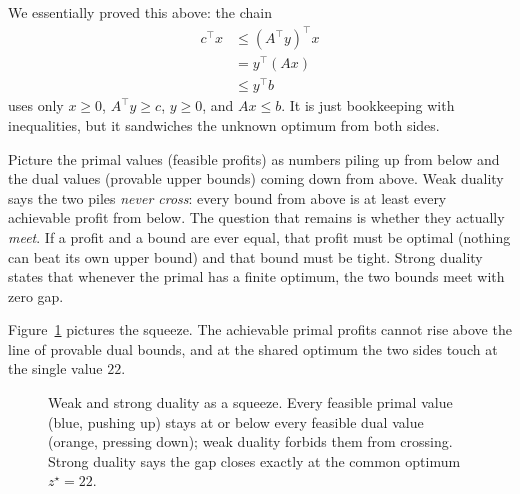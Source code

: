 We essentially proved this above: the chain
\begin{align*}
c^\top x &\le (A^\top y)^\top x \\
&= y^\top (Ax) \\
&\le y^\top b
\end{align*}
uses only $x \ge 0$, $A^\top y \ge c$, $y \ge 0$, and
$Ax \le b$. It is just bookkeeping with inequalities, but it
sandwiches the unknown optimum from both sides.

\begin{intuitionbox}
Picture the primal values (feasible profits) as numbers piling up from below
and the dual values (provable upper bounds) coming down from above. Weak
duality says the two piles \emph{never cross}: every bound from above is at
least every achievable profit from below. The question that remains is whether
they actually \emph{meet}. If a profit and a bound are ever equal, that profit
must be optimal (nothing can beat its own upper bound) and that bound must be
tight. Strong duality states that whenever the primal has a finite optimum, the
two bounds meet with zero gap.
\end{intuitionbox}

Figure~\ref{ch28:fig-sandwich} pictures the squeeze. The achievable primal
profits cannot rise above the line of provable dual bounds, and at the shared
optimum the two sides touch at the single value $22$.

\begin{figure}[H]
\centering
{}
\caption{Weak and strong duality as a squeeze. Every feasible primal value
(blue, pushing up) stays at or below every feasible dual value (orange, pressing
down); weak duality forbids them from crossing. Strong duality says the gap
closes exactly at the common optimum $z^\star = 22$.}
\label{ch28:fig-sandwich}
\end{figure}


